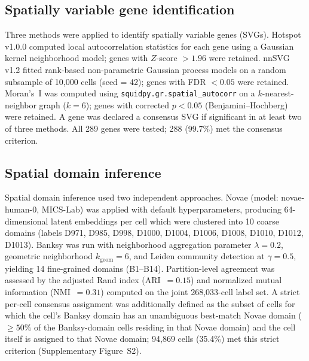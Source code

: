 \documentclass[12pt,a4paper]{article}
\begin{document}
\subsection*{Spatially variable gene identification}
Three methods were applied to identify spatially variable genes (SVGs). Hotspot \citep{detomaso2021hotspot} v1.0.0 computed local autocorrelation statistics for each gene using a Gaussian kernel neighborhood model; genes with $Z$-score $> 1.96$ were retained. nnSVG \citep{weber2023nnsvg} v1.2 fitted rank-based non-parametric Gaussian process models on a random subsample of 10,000 cells (seed = 42); genes with FDR $< 0.05$ were retained. Moran's~I was computed using \texttt{squidpy.gr.spatial\_autocorr} \citep{palla2022squidpy} on a $k$-nearest-neighbor graph ($k=6$); genes with corrected $p < 0.05$ (Benjamini--Hochberg) were retained. A gene was declared a consensus SVG if significant in at least two of three methods. All 289 genes were tested; 288 (99.7\%) met the consensus criterion.

\subsection*{Spatial domain inference}
Spatial domain inference used two independent approaches. Novae \citep{schaar2025novae} (model: novae-human-0, MICS-Lab) was applied with default hyperparameters, producing 64-dimensional latent embeddings per cell which were clustered into 10 coarse domains (labels D971, D985, D998, D1000, D1004, D1006, D1008, D1010, D1012, D1013). Banksy \citep{zhao2023banksy} was run with neighborhood aggregation parameter $\lambda = 0.2$, geometric neighborhood $k_{\text{geom}} = 6$, and Leiden community detection at $\gamma = 0.5$, yielding 14 fine-grained domains (B1--B14). Partition-level agreement was assessed by the adjusted Rand index (ARI~$=0.15$) and normalized mutual information (NMI~$=0.31$) computed on the joint 268,033-cell label set. A strict per-cell consensus assignment was additionally defined as the subset of cells for which the cell's Banksy domain has an unambiguous best-match Novae domain ($\geq 50\%$ of the Banksy-domain cells residing in that Novae domain) and the cell itself is assigned to that Novae domain; 94,869 cells (35.4\%) met this strict criterion (Supplementary Figure~S2).
\end{document}

